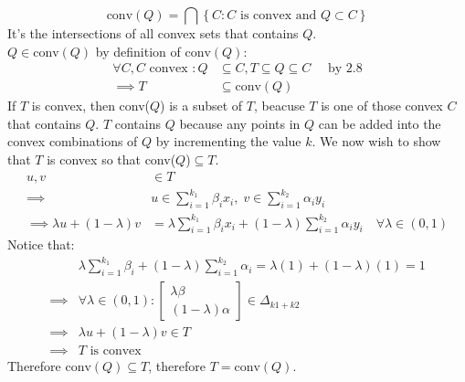 \documentclass[]{article}
\begin{document}
    $$
        \text{conv}(Q) = \bigcap \left\lbrace
            C: C \text{ is convex and } Q \subset C
        \right\rbrace
    $$
    It's the intersections of all convex sets that contains $Q$. 
    \\[1.1em]
    $Q\in \text{conv}(Q)$ by definition of $\text{conv}(Q)$: 
    \begin{align*}\tag{2.8.1}\label{eqn:2.8.1}
        \forall C, C \text{ convex }: Q &\subseteq C, T\subseteq Q \subseteq  C \quad \text{ by 2.8}
        \\
        \implies T&\subseteq \text{conv}(Q)
    \end{align*}
    If $T$ is convex, then conv($Q$) is a subset of $T$, beacuse $T$ is one of those convex $C$  that contains $Q$. $T$ contains $Q$ because any points in $Q$ can be added into the convex combinations of $Q$ by incrementing the value $k$. We now wish to show that $T$  is convex so that conv($Q$)$\subseteq T$. 
    \\
    \begin{align*}\tag{2.8.2}\label{eqn:2.8.2}
        u, v &\in T \\
        \implies &
        u \in \sum_{i = 1}^{k_1}\beta_i x_i,\; v \in \sum_{ i =1 }^{k_2} \alpha_i y_i
        \\\implies 
        \lambda u + (1 - \lambda) v &= 
        \lambda\sum_{i = 1}^{k_1}\beta_i x_i + (1 - \lambda) \sum_{i = 1}^{k_2}\alpha_i y_i \quad \forall \lambda \in (0, 1)
    \end{align*}
    Notice that: 
    \begin{align*}\tag{2.8.3}\label{eqn:2.8.3}
        &\lambda \sum_{i = 1}^{k_1} \beta_i + (1 - \lambda)\sum_{i = 1}^{k_2}\alpha_i = \lambda(1) + ( 1- \lambda)(1) = 1
        \\
        \implies & \forall \lambda \in (0, 1): \begin{bmatrix}
            \lambda\beta \\ (1 - \lambda)\alpha
        \end{bmatrix} \in \Delta_{k1 + k2}
        \\
        \implies &\lambda u + (1 - \lambda) v \in T
        \\\implies
        & T \text{ is convex}
    \end{align*}
    Therefore $\text{conv}(Q) \subseteq T$, therefore $T = \text{conv}(Q)$. 
\end{document}
